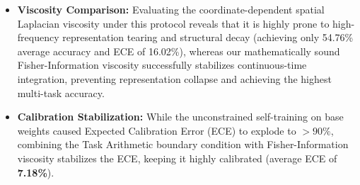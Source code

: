 \begin{itemize}
    \item \textbf{Viscosity Comparison:} Evaluating the coordinate-dependent spatial Laplacian viscosity under this protocol reveals that it is highly prone to high-frequency representation tearing and structural decay (achieving only 54.76\% average accuracy and ECE of 16.02\%), whereas our mathematically sound Fisher-Information viscosity successfully stabilizes continuous-time integration, preventing representation collapse and achieving the highest multi-task accuracy.
    \item \textbf{Calibration Stabilization:} While the unconstrained self-training on base weights caused Expected Calibration Error (ECE) to explode to $>90\%$, combining the Task Arithmetic boundary condition with Fisher-Information viscosity stabilizes the ECE, keeping it highly calibrated (average ECE of \textbf{7.18\%}).
\end{itemize}

